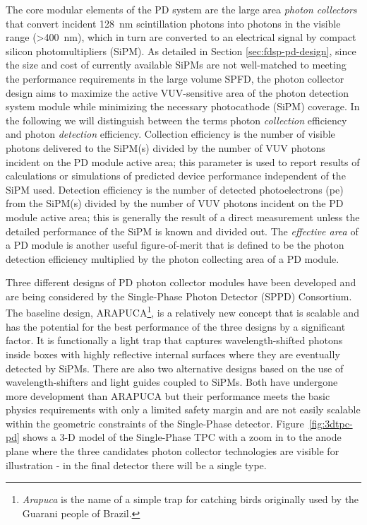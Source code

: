 The core modular elements of the PD system are the large area {\it photon collectors} that convert incident \SI{128}{nm} scintillation photons into photons in the visible range (>\SI{400}{nm}), which in turn are converted to an electrical signal by compact silicon photomultipliers (SiPM). 
As detailed in Section \ref{sec:fdsp-pd-design}, since the size and cost of currently available SiPMs are not well-matched to meeting the performance requirements in the large volume  SPFD, the photon collector design aims to maximize the active VUV-sensitive area of the photon detection system module while minimizing the necessary photocathode (SiPM) coverage. 
In the following we will distinguish between the terms photon {\it collection} efficiency and photon {\it detection} efficiency. Collection efficiency is the number of visible photons delivered to the SiPM(s) divided by the number of VUV photons incident on the PD module active area; this parameter is used to report results of calculations or simulations of predicted device performance independent of the SiPM used.  Detection efficiency is the number of detected photoelectrons (pe) from the SiPM(s) divided by the number of VUV photons incident on the PD module active area; this is generally the result of a direct measurement unless the detailed performance of the SiPM is known and divided out. The {\it effective area} of a PD module is another useful figure-of-merit that is defined to be the photon detection efficiency multiplied by the photon collecting area of a PD module. 

Three different designs of PD photon collector modules have been developed and are being considered by the Single-Phase Photon Detector (SPPD) Consortium. The baseline design, ARAPUCA\footnote{{\it Arapuca} is the name of a simple trap for catching birds originally used by the Guarani people of Brazil.}, is a relatively new concept that is scalable and has the potential for the best performance of the three designs by a significant factor. It is functionally a light trap that captures wavelength-shifted photons inside boxes with highly reflective internal surfaces where they are eventually detected by SiPMs.  There are also two alternative designs based on the use of wavelength-shifters and light guides coupled to SiPMs. Both have undergone more development than ARAPUCA but their performance meets the basic physics requirements with only a limited safety margin and are not easily scalable within the geometric constraints of the Single-Phase detector.
Figure~\ref{fig:3dtpc-pd} shows a 3-D model of the Single-Phase TPC with a zoom in to the anode plane where the three candidates photon collector technologies are visible for illustration - in the final detector there will be a single type.

